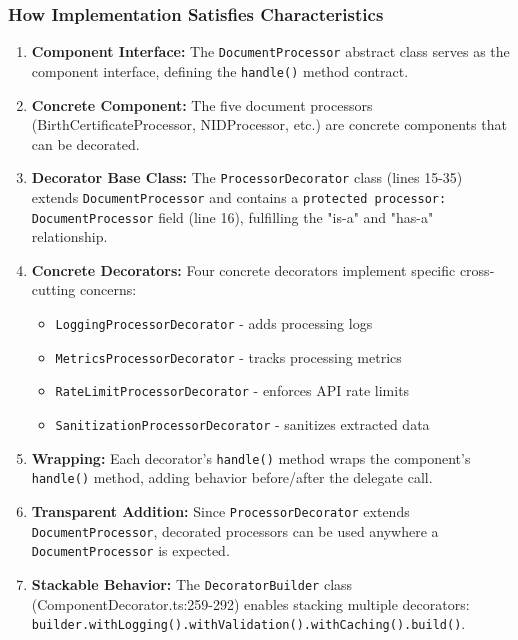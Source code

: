 \documentclass[11pt]{article}
\begin{document}
\subsubsection{How Implementation Satisfies Characteristics}

\begin{enumerate}[noitemsep]
    \item \textbf{Component Interface:} The \texttt{DocumentProcessor} abstract class serves as the component interface, defining the \texttt{handle()} method contract.

    \item \textbf{Concrete Component:} The five document processors (BirthCertificateProcessor, NIDProcessor, etc.) are concrete components that can be decorated.

    \item \textbf{Decorator Base Class:} The \texttt{ProcessorDecorator} class (lines 15-35) extends \texttt{DocumentProcessor} and contains a \texttt{protected processor: DocumentProcessor} field (line 16), fulfilling the "is-a" and "has-a" relationship.

    \item \textbf{Concrete Decorators:} Four concrete decorators implement specific cross-cutting concerns:
    \begin{itemize}[noitemsep]
        \item \texttt{LoggingProcessorDecorator} - adds processing logs
        \item \texttt{MetricsProcessorDecorator} - tracks processing metrics
        \item \texttt{RateLimitProcessorDecorator} - enforces API rate limits
        \item \texttt{SanitizationProcessorDecorator} - sanitizes extracted data
    \end{itemize}

    \item \textbf{Wrapping:} Each decorator's \texttt{handle()} method wraps the component's \texttt{handle()} method, adding behavior before/after the delegate call.

    \item \textbf{Transparent Addition:} Since \texttt{ProcessorDecorator} extends \texttt{DocumentProcessor}, decorated processors can be used anywhere a \texttt{DocumentProcessor} is expected.

    \item \textbf{Stackable Behavior:} The \texttt{DecoratorBuilder} class (ComponentDecorator.ts:259-292) enables stacking multiple decorators: \texttt{builder.withLogging().withValidation().withCaching().build()}.
\end{enumerate}
\end{document}
